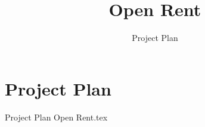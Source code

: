 \documentclass[a4paper,11pt]{book}
\title{Open Rent}
\author{Project Plan}
\date{}
\begin{document}
 \chapter{Project Plan}
{Project Plan Open Rent.tex}
\end{document}
